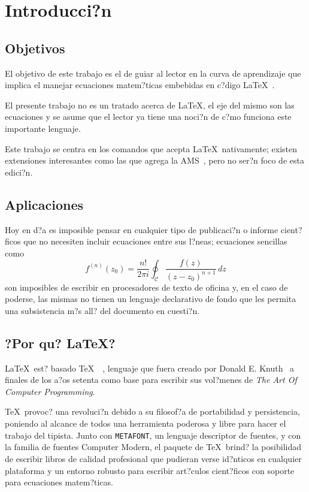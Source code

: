 \documentclass[a4paper,12pt]{article}
\begin{document}
\newpage

\tableofcontents

\newpage

\section{Introducci?n}

\subsection{Objetivos}

El objetivo de este trabajo es el de guiar al lector en la curva de aprendizaje que implica el manejar ecuaciones matem?ticas embebidas en c?digo \LaTeX~\cite{ltx}.

El presente trabajo no es un tratado acerca de \LaTeX, el eje del mismo son las ecuaciones y se asume que el lector ya tiene una noci?n de c?mo funciona este importante lenguaje.

Este trabajo se centra en los comandos que acepta \LaTeX\ nativamente; existen extensiones interesantes como las que agrega la AMS~\cite{ams}, pero no ser?n foco de esta edici?n.

\subsection{Aplicaciones}

Hoy en d?a es imposible pensar en cualquier tipo de publicaci?n o informe cient?ficos que no necesiten incluir ecuaciones entre sus l?neas; ecuaciones sencillas como
\[ \displaystyle f^{(n)} (z_0) = \frac{n !}{2 \pi i} \oint_{\mathcal{C}} \frac{f(z)}{(z - z_0)^{n+1}}\, dz \]
son imposibles de escribir en procesadores de texto de oficina y, en el caso de poderse, las mismas no tienen un lenguaje declarativo de fondo que les permita una subsistencia m?s all? del documento en cuesti?n.

\subsection{?Por qu? \LaTeX?}

\LaTeX\ est? basado \TeX~\cite{tex}~\cite{tug}, lenguaje que fuera creado por Donald E. Knuth~\cite{dek} a finales de los a?os setenta como base para escribir sus vol?menes de \emph{The Art Of Computer Programming}.

\TeX\ provoc? una revoluci?n debido a su filosof?a de portabilidad y persistencia, poniendo al alcance de todos una herramienta poderosa y libre para hacer el trabajo del tipista. Junto con
\texttt{METAFONT}, %
un lenguaje descriptor de fuentes, y con la familia de fuentes Computer Modern, el paquete de \TeX\ brind? la posibilidad de escribir libros de calidad profesional que pudieran verse id?nticos en cualquier plataforma y un entorno robusto para escribir art?culos cient?ficos con soporte para ecuaciones matem?ticas.
\end{document}
